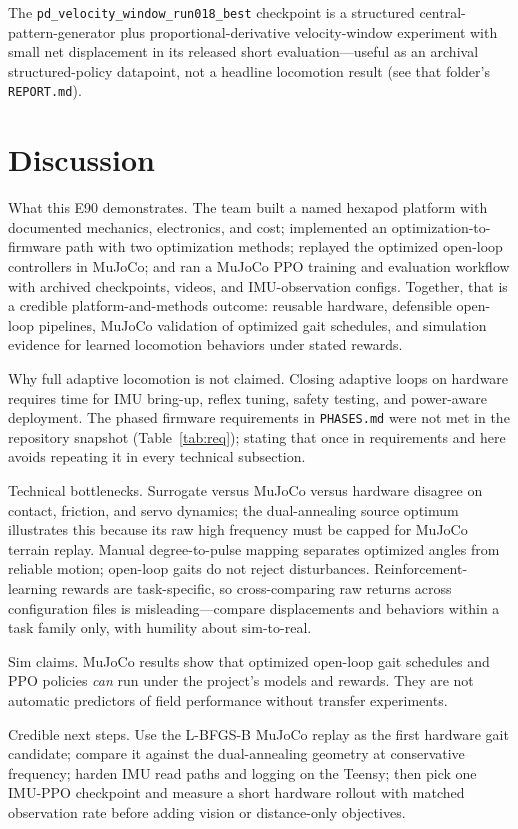 \documentclass[11pt]{article}
\begin{document}
The \texttt{pd\_velocity\_window\_run018\_best} checkpoint is a structured central-pattern-generator plus proportional-derivative velocity-window experiment with small net displacement in its released short evaluation---useful as an archival structured-policy datapoint, not a headline locomotion result (see that folder's \texttt{REPORT.md}).

\section{Discussion}

What this E90 demonstrates. The team built a named hexapod platform with documented mechanics, electronics, and cost; implemented an optimization-to-firmware path with two optimization methods; replayed the optimized open-loop controllers in MuJoCo; and ran a MuJoCo PPO training and evaluation workflow with archived checkpoints, videos, and IMU-observation configs. Together, that is a credible platform-and-methods outcome: reusable hardware, defensible open-loop pipelines, MuJoCo validation of optimized gait schedules, and simulation evidence for learned locomotion behaviors under stated rewards.

Why full adaptive locomotion is not claimed. Closing adaptive loops on hardware requires time for IMU bring-up, reflex tuning, safety testing, and power-aware deployment. The phased firmware requirements in \texttt{PHASES.md} were not met in the repository snapshot (Table~\ref{tab:req}); stating that once in requirements and here avoids repeating it in every technical subsection.

Technical bottlenecks. Surrogate versus MuJoCo versus hardware disagree on contact, friction, and servo dynamics; the dual-annealing source optimum illustrates this because its raw high frequency must be capped for MuJoCo terrain replay. Manual degree-to-pulse mapping separates optimized angles from reliable motion; open-loop gaits do not reject disturbances. Reinforcement-learning rewards are task-specific, so cross-comparing raw returns across configuration files is misleading---compare displacements and behaviors within a task family only, with humility about sim-to-real.

Sim claims. MuJoCo results show that optimized open-loop gait schedules and PPO policies \emph{can} run under the project's models and rewards. They are not automatic predictors of field performance without transfer experiments.

Credible next steps. Use the L-BFGS-B MuJoCo replay as the first hardware gait candidate; compare it against the dual-annealing geometry at conservative frequency; harden IMU read paths and logging on the Teensy; then pick one IMU-PPO checkpoint and measure a short hardware rollout with matched observation rate before adding vision or distance-only objectives.
\end{document}
